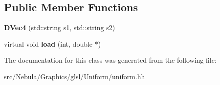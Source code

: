 \subsection*{\-Public \-Member \-Functions}
\begin{DoxyCompactItemize}
\item 
\hypertarget{classNeb_1_1glsl_1_1Uniform_1_1Vector_1_1DVec4_a254fb963ff4b99ac68c62d89c67e717d}{{\bfseries \-D\-Vec4} (std\-::string s1, std\-::string s2)}\label{classNeb_1_1glsl_1_1Uniform_1_1Vector_1_1DVec4_a254fb963ff4b99ac68c62d89c67e717d}

\item 
\hypertarget{classNeb_1_1glsl_1_1Uniform_1_1Vector_1_1DVec4_ab03fde9830f3d081d04523701da594e3}{virtual void {\bfseries load} (int, double $\ast$)}\label{classNeb_1_1glsl_1_1Uniform_1_1Vector_1_1DVec4_ab03fde9830f3d081d04523701da594e3}

\end{DoxyCompactItemize}


\-The documentation for this class was generated from the following file\-:\begin{DoxyCompactItemize}
\item 
src/\-Nebula/\-Graphics/glsl/\-Uniform/uniform.\-hh\end{DoxyCompactItemize}
